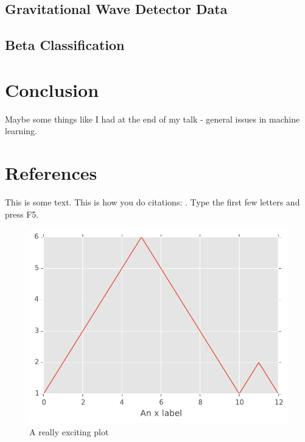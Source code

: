 \documentclass[a4paper]{jpconf}
\begin{document}
\subsection{Gravitational Wave Detector Data}
\subsection{Beta Classification}
\section{Conclusion}
Maybe some things like I had at the end of my talk - general issues in machine learning.
\section*{References} 

This is some text. This is how you do citations: \cite{}. Type the first few letters and press F5.
\begin{center}
    \begin{figure}
            \includegraphics[width=\textwidth]{testMatplotlibPlot.pdf}
            \caption{A really exciting plot}
    \end{figure}
\end{center}
\end{document}
